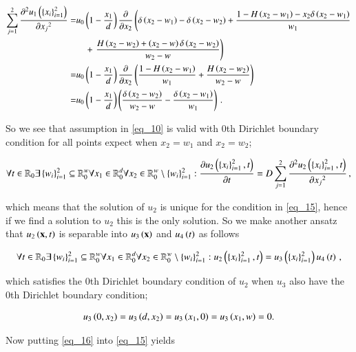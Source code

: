 \documentclass[11pt,english,a4paper]{article}
\begin{document}
\begin{flushleft}
\begin{align}
\sum_{j=1}^2 \frac{\partial ^2 u_1\left({\left\lbrace{x_i}\right\rbrace_{i=1}^2}\right)}{\partial {x_j}^2} 
=& u_0\left({1-\frac{x_1}{d}}\right)\frac{\partial}{\partial x_2}\left(\delta\left({x_2-w_1}\right)-\delta\left({x_2-w_2}\right) +\frac{1-H\left({x_2-w_1}\right) -x_2\delta\left({x_2-w_1}\right)}{w_1} \right.
\nonumber\\
&\quad + \left. \frac{H\left({x_2-w_2}\right)+\left({x_2-w}\right)\delta\left({x_2-w_2}\right)}{w_2-w}\right)
\nonumber\\
=& u_0\left({1-\frac{x_1}{d}}\right)\frac{\partial}{\partial x_2}\left({\frac{1-H\left({x_2-w_1}\right)}{w_1} + \frac{H\left({x_2-w_2}\right)}{w_2-w}}\right)
\nonumber\\
=& u_0\left({1-\frac{x_1}{d}}\right)\left({\frac{\delta\left({x_2-w_2}\right)}{w_2-w} - \frac{\delta\left({x_2-w_1}\right)}{w_1}}\right) \,.
\label{eq_14}
\end{align}

So we see that assumption in \eqref{eq_10} is valid with 0th Dirichlet boundary condition for all points expect when $x_2=w_1$ and $x_2=w_2$;

\begin{align}
\forall t\in \mathbb{R}_0\exists\left\lbrace{w_i}\right\rbrace_{i=1}^2\subseteq \mathbb{R}_0^w \forall x_1\in \mathbb{R}_{0}^d \forall x_2\in\mathbb{R}_0^w \setminus \left\lbrace{w_i}\right\rbrace_{i=1}^2 : \frac{\partial u_2\left({\left\lbrace{x_i}\right\rbrace_{i=1}^2,t}\right)}{\partial t} = D\sum_{j=1}^2\frac{\partial^2 u_2\left({\left\lbrace{x_i}\right\rbrace_{i=1}^2,t}\right)}{\partial {x_j}^2} \,,
\label{eq_15}
\end{align}

which means that the solution of $u_2$ is unique for the condition in \eqref{eq_15}, hence if we find a solution to $u_2$ this is the only solution. So we make another ansatz that $u_2\left({\textbf{x},t}\right)$ is separable into $u_3\left({\textbf{x}}\right)$ and $u_4\left({t}\right)$ as follows

\begin{align}
\forall t\in \mathbb{R}_0\exists\left\lbrace{w_i}\right\rbrace_{i=1}^2\subseteq \mathbb{R}_0^w \forall x_1\in \mathbb{R}_{0}^d \forall x_2\in\mathbb{R}_0^w \setminus \left\lbrace{w_i}\right\rbrace_{i=1}^2 : u_2\left({\left\lbrace{x_i}\right\rbrace_{i=1}^2,t}\right) = u_3\left({\left\lbrace{x_i}\right\rbrace_{i=1}^2}\right)u_4\left({t}\right) \,,
\label{eq_16}
\end{align}

which satisfies the 0th Dirichlet boundary condition of $u_2$ when $u_3$ also have the 0th Dirichlet boundary condition;

\begin{align*}
u_3\left({0,x_2}\right)=u_3\left({d,x_2}\right)=u_3\left({x_1,0}\right)=u_3\left({x_1,w}\right)=0.
\end{align*}

Now putting \eqref{eq_16} into \eqref{eq_15} yields


\end{flushleft}
\end{document}
